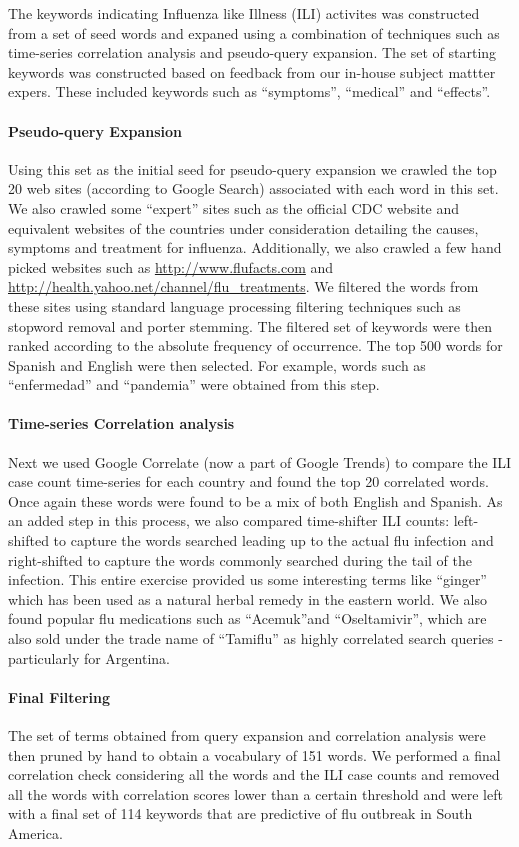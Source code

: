 
The keywords indicating Influenza like Illness (ILI) activites was
constructed from a set of seed words and expaned using a combination of 
techniques such as time-series correlation analysis and pseudo-query
expansion.
The set of starting keywords was constructed based on feedback from our 
in-house subject mattter expers. These included keywords such as 
``symptoms'', ``medical'' and ``effects''.
\paragraph{Pseudo-query Expansion}
Using this set as the initial seed for pseudo-query expansion we crawled
the top 20 web sites (according to Google Search) associated with each
word in this set. We also crawled some ``expert'' sites such as the official CDC
website and equivalent websites of the countries under consideration detailing the
causes, symptoms and treatment for influenza.
Additionally, we also crawled a few hand picked websites such as
\url{http://www.flufacts.com} and \url{http://health.yahoo.net/channel/flu\_treatments}.
We filtered the words from these sites using standard language
processing filtering techniques such as stopword removal and porter
stemming. The filtered set of keywords were then ranked according to 
the absolute frequency of occurrence. The top 500 words for Spanish and
English were then selected. For example, words such as ``enfermedad'' 
and ``pandemia'' were obtained from this step.
\paragraph{Time-series Correlation analysis}
Next we used Google Correlate (now a part of Google Trends) to compare
the ILI case count time-series for each country and found the top 20
correlated words. Once again these words were found to be a mix of 
 both English and Spanish. As an added step in this process, we also
 compared time-shifter ILI counts: left-shifted  to capture the words searched leading up to 
 the actual flu infection and right-shifted to capture the words
commonly searched during the tail of the infection. 
This entire exercise provided us some interesting terms like ``ginger'' which has been used as
a natural herbal remedy in the eastern world. We also found popular flu medications
such as ``Acemuk''and  ``Oseltamivir'', which are also sold under the trade name of
``Tamiflu'' as highly correlated search queries - particularly for
Argentina.
\paragraph{Final Filtering}
The set of terms obtained from query expansion and correlation analysis were then 
pruned by hand to obtain a vocabulary of 151 words. We performed a final
correlation check considering all the words and the ILI case counts and
removed all the words with correlation scores lower than a certain
threshold and were left with a final set of 114 keywords that are
predictive of flu outbreak in South America.

